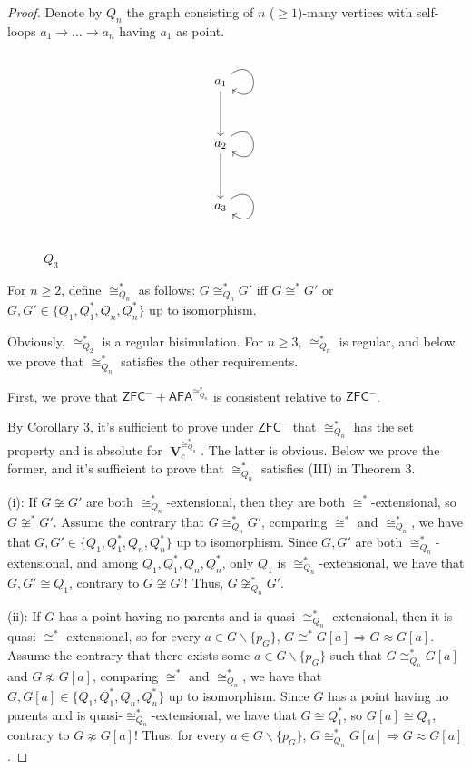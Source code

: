 \documentclass{amsart}
\newcommand{\zfc}{\mathsf{ZFC}}
\newcommand{\afa}{\mathsf{AFA}}
\DeclareMathOperator{\uni}{\mathbf{V}}
\begin{document}
\begin{proof}
    Denote by $Q_n$ the graph consisting of $n$ ($\geq 1$)-many vertices with self-loops $a_1\to\dots\to a_n$ having $a_1$ as point.
    
\begin{figure}[htbp]
\[\begin{tikzcd}
	{a_1} \\
	\\
	{a_2} \\
	\\
	{a_3}
	\arrow[from=1-1, to=1-1, loop, in=325, out=35, distance=10mm]
	\arrow[from=1-1, to=3-1]
	\arrow[from=3-1, to=3-1, loop, in=325, out=35, distance=10mm]
	\arrow[from=3-1, to=5-1]
	\arrow[from=5-1, to=5-1, loop, in=325, out=35, distance=10mm]
\end{tikzcd}\]
\caption{$Q_3$}
\end{figure}

    For $n\geq2$, define $\cong_{Q_n}^*$ as follows: $G\cong_{Q_n}^*G'$ iff $G\cong^*G'$ or $G,G'\in\{Q_1,Q_1^*,Q_n,Q_n^*\}$ up to isomorphism.
    
    Obviously, $\cong_{Q_2}^*$ is a regular bisimulation. For $n\geq3$, $\cong_{Q_n}^*$ is regular, and below we prove that $\cong_{Q_n}^*$ satisfies the other requirements.

    First, we prove that $\zfc^-+\afa^{\cong_{Q_n}^*}$ is consistent relative to $\zfc^-$.
    
    By Corollary 3, it's sufficient to prove under $\zfc^-$ that $\cong_{Q_n}^*$ has the set property and is absolute for $\uni_c^{\cong_{Q_n}^*}$.
    The latter is obvious. Below we prove the former, and it's sufficient to prove that $\cong_{Q_n}^*$ satisfies (III) in Theorem 3.
    
    (i): If $G\not\cong G'$ are both $\cong_{Q_n}^*$-extensional, then they are both $\cong^*$-extensional, so $G\not\cong^*G'$.
    Assume the contrary that $G\cong_{Q_n}^* G'$, comparing $\cong^*$ and $\cong_{Q_n}^*$, we have that $G,G'\in\{Q_1,Q_1^*,Q_n,Q_n^*\}$ up to isomorphism. Since $G,G'$ are both $\cong_{Q_n}^*$-extensional, and among $Q_1,Q_1^*,Q_n,Q_n^*$, only $Q_1$ is $\cong_{Q_n}^*$-extensional, we have that $G,G'\cong Q_1$, contrary to $G\not\cong G'$!
    Thus, $G\not\cong_{Q_n}^* G'$.
    
    (ii): If $G$ has a point having no parents and is quasi-$\cong_{Q_n}^*$-extensional, then it is quasi-$\cong^*$-extensional, so for every $a\in G\backslash\{p_G\}$, $G\cong^* G[a]\Rightarrow G\approx G[a]$.
    Assume the contrary that there exists some $a\in G\backslash\{p_G\}$ such that $G\cong_{Q_n}^* G[a]$ and $G\not\approx G[a]$, comparing $\cong^*$ and $\cong_{Q_n}^*$, we have that $G,G[a]\in\{Q_1,Q_1^*,Q_n,Q_n^*\}$ up to isomorphism. Since $G$ has a point having no parents and is quasi-$\cong_{Q_n}^*$-extensional, we have that $G\cong Q_1^*$, so $G[a]\cong Q_1$, contrary to $G\not\approx G[a]$!
    Thus, for every $a\in G\backslash\{p_G\}$, $G\cong_{Q_n}^* G[a]\Rightarrow G\approx G[a]$.
        

\end{proof}
\end{document}
